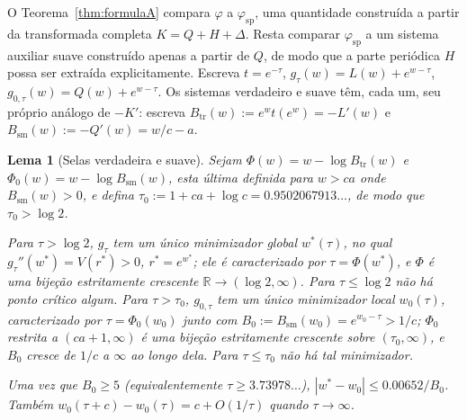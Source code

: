\documentclass[11pt]{amsart}
\theoremstyle{plain}
\newtheorem{lemma}[theorem]{Lema}
\theoremstyle{definition}
\theoremstyle{remark}
\newcommand{\R}{\mathbb{R}}
\begin{document}
O Teorema~\ref{thm:formulaA} compara $\varphi$ a $\varphi_{\mathrm{sp}}$, uma quantidade construída
a partir da transformada completa $K=Q+H+\Delta$. Resta comparar $\varphi_{\mathrm{sp}}$ a um
sistema auxiliar suave construído apenas a partir de $Q$, de modo que a parte periódica $H$ possa
ser extraída explicitamente. Escreva $t=e^{-\tau}$, $g_\tau(w) = L(w)+e^{w-\tau}$, $g_{0,\tau}(w) =
Q(w)+e^{w-\tau}$. Os sistemas verdadeiro e suave têm, cada um, seu próprio análogo de $-K'$:
escreva $B_{\mathrm{tr}}(w) := e^wt(e^w) = -L'(w)$ e $B_{\mathrm{sm}}(w) := -Q'(w) = w/c-a$.

\begin{lemma}[Selas verdadeira e suave]
\label{lem:saddles}
Sejam $\Phi(w) = w-\log B_{\mathrm{tr}}(w)$ e $\Phi_0(w) = w-\log B_{\mathrm{sm}}(w)$, esta última
definida para $w>ca$ onde $B_{\mathrm{sm}}(w)>0$, e defina
$\tau_0 := 1+ca+\log c = 0.9502067913\ldots$, de modo que $\tau_0 > \log 2$.

Para $\tau>\log 2$, $g_\tau$ tem um único minimizador global $w^*(\tau)$, no qual $g_\tau''(w^*) =
V(r^*)>0$, $r^*=e^{w^*}$; ele é caracterizado por $\tau = \Phi(w^*)$, e $\Phi$ é uma bijeção
estritamente crescente $\R\to(\log 2,\infty)$. Para $\tau\le\log 2$ não há ponto crítico algum. Para
$\tau>\tau_0$, $g_{0,\tau}$ tem um único minimizador local $w_0(\tau)$, caracterizado por
$\tau=\Phi_0(w_0)$ junto com $B_0 := B_{\mathrm{sm}}(w_0) = e^{w_0-\tau} > 1/c$; $\Phi_0$ restrita a
$(ca+1,\infty)$ é uma bijeção estritamente crescente sobre $(\tau_0,\infty)$, e $B_0$ cresce de
$1/c$ a $\infty$ ao longo dela. Para $\tau\le\tau_0$ não há tal minimizador.

Uma vez que $B_0\ge5$ (equivalentemente $\tau\ge3.73978\ldots$), $|w^*-w_0| \le 0.00652/B_0$.
Também $w_0(\tau+c)-w_0(\tau) = c+O(1/\tau)$ quando $\tau\to\infty$.
\end{lemma}
\end{document}
